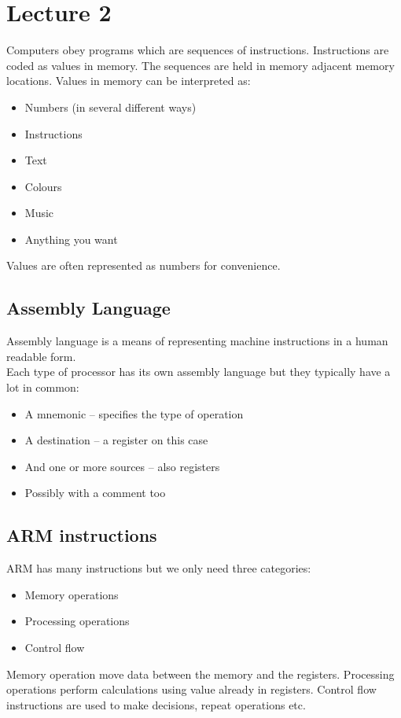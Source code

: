 \documentclass{article}
\begin{document}
\section{Lecture 2}
Computers obey programs which are sequences of instructions. Instructions are coded as values in memory. The sequences are held in memory adjacent memory locations. Values in memory can be interpreted as:
\begin{itemize}
	\item Numbers (in several different ways)
	\item Instructions
	\item Text
	\item Colours
	\item Music
	\item Anything you want
\end{itemize}
Values are often represented as numbers for convenience.

\subsection{Assembly Language}
Assembly language is a means of representing machine instructions in a human readable form.\\
Each type of processor has its own assembly language but they typically have a lot in common:
\begin{itemize}
	\item A mnemonic – specifies the type of operation
	\item A destination – a register on this case
	\item And one or more sources – also registers
	\item Possibly with a comment too
\end{itemize}

\subsection{ARM instructions}
ARM has many instructions but we only need three categories:
\begin{itemize}
	\item Memory operations
	\item Processing operations
	\item Control flow
\end{itemize}
Memory operation move data between the memory and the registers. Processing operations perform calculations using value already in registers. Control flow instructions are used to make decisions, repeat operations etc.
\end{document}

